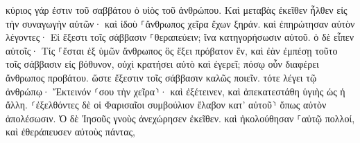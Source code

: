 \documentclass{openreader}
\begin{document}
κύριος γάρ ἐστιν τοῦ σαββάτου ὁ υἱὸς τοῦ ἀνθρώπου. 
Καὶ μεταβὰς ἐκεῖθεν ἦλθεν εἰς τὴν συναγωγὴν αὐτῶν· 
καὶ ἰδοὺ ⸀ἄνθρωπος χεῖρα ἔχων ξηράν. καὶ ἐπηρώτησαν αὐτὸν λέγοντες· Εἰ ἔξεστι τοῖς σάββασιν ⸀θεραπεύειν; ἵνα κατηγορήσωσιν αὐτοῦ. 
ὁ δὲ εἶπεν αὐτοῖς· Τίς ⸀ἔσται ἐξ ὑμῶν ἄνθρωπος ὃς ἕξει πρόβατον ἕν, καὶ ἐὰν ἐμπέσῃ τοῦτο τοῖς σάββασιν εἰς βόθυνον, οὐχὶ κρατήσει αὐτὸ καὶ ἐγερεῖ; 
πόσῳ οὖν διαφέρει ἄνθρωπος προβάτου. ὥστε ἔξεστιν τοῖς σάββασιν καλῶς ποιεῖν. 
τότε λέγει τῷ ἀνθρώπῳ· Ἔκτεινόν ⸂σου τὴν χεῖρα⸃· καὶ ἐξέτεινεν, καὶ ἀπεκατεστάθη ὑγιὴς ὡς ἡ ἄλλη. 
⸂ἐξελθόντες δὲ οἱ Φαρισαῖοι συμβούλιον ἔλαβον κατ’ αὐτοῦ⸃ ὅπως αὐτὸν ἀπολέσωσιν. 
Ὁ δὲ Ἰησοῦς γνοὺς ἀνεχώρησεν ἐκεῖθεν. καὶ ἠκολούθησαν ⸀αὐτῷ πολλοί, καὶ ἐθεράπευσεν αὐτοὺς πάντας, 
\end{document}
